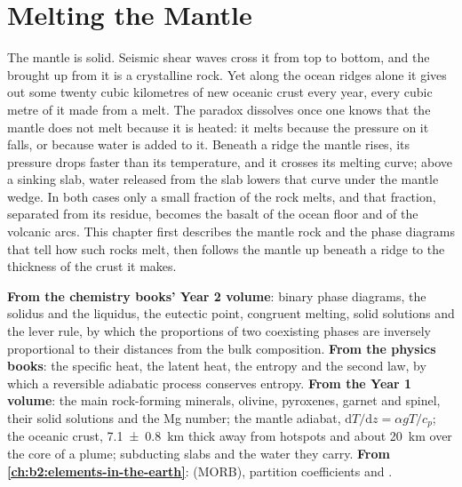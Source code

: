 \chapter{Melting the Mantle}\label{ch:b2:mantle-melting}

The mantle is solid. Seismic shear waves cross it from top to bottom, and the
 brought up from it is a crystalline rock. Yet along the ocean ridges
alone it gives out some twenty cubic kilometres of new oceanic crust every year,
every cubic metre of it made from a melt. The paradox dissolves once one knows
that the mantle does not melt because it is heated: it melts because the
pressure on it falls, or because water is added to it. Beneath a ridge the
mantle rises, its pressure drops faster than its temperature, and it crosses its
melting curve; above a sinking slab, water released from the slab lowers that
curve under the mantle wedge. In both cases only a small fraction of the rock
melts, and that fraction, separated from its residue, becomes the basalt of the
ocean floor and of the volcanic arcs. This chapter first describes the mantle
rock and the phase diagrams that tell how such rocks melt, then follows the
mantle up beneath a ridge to the thickness of the crust it makes.

\begin{recall}
\textbf{From the chemistry books' Year 2 volume}: binary phase diagrams, the
solidus and the liquidus, the eutectic point, congruent melting, solid solutions
and the lever rule, by which the proportions of two coexisting phases are
inversely proportional to their distances from the bulk composition.
\textbf{From the physics books}: the specific heat, the latent heat, the entropy
and the second law, by which a reversible adiabatic process conserves entropy.
\textbf{From the Year 1 volume}: the main rock-forming minerals, olivine,
pyroxenes, garnet and spinel, their solid solutions and the Mg number; the
mantle adiabat, $\mathrm dT/\mathrm dz = \alpha gT/c_p$; the oceanic crust,
\qty[uncertainty-mode=separate]{7.1 \pm 0.8}{km} thick away from hotspots and
about \qty{20}{km} over the core of a plume; subducting slabs and the water they
carry. \textbf{From \cref{ch:b2:elements-in-the-earth}}: 
(MORB), partition coefficients and .
\end{recall}

